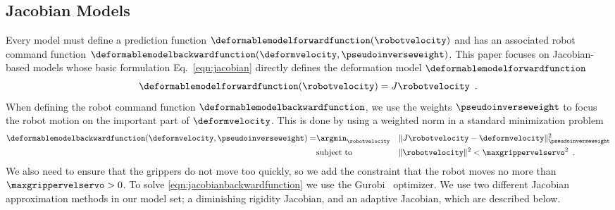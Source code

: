 \subsection{Jacobian Models}
\label{sec:jacobian_models}

Every model must define a prediction function $\deformablemodelforwardfunction(\robotvelocity)$ and has an associated robot command function $\deformablemodelbackwardfunction(\deformvelocity, \pseudoinverseweight)$. This paper focuses on Jacobian-based models whose basic formulation Eq.~\eqref{eqn:jacobian} directly defines the deformation model $\deformablemodelforwardfunction$
\begin{equation}
    \deformablemodelforwardfunction(\robotvelocity) = J \robotvelocity \enspace.
    \label{eqn:jacobianforwardfunction}
\end{equation}
When defining the robot command function $\deformablemodelbackwardfunction$, we use the weights $\pseudoinverseweight$ to focus the robot motion on the important part of $\deformvelocity$. This is done by using a weighted norm in a standard minimization problem
\begin{equation}
    \begin{aligned}
        \deformablemodelbackwardfunction(\deformvelocity, \pseudoinverseweight) =
                    & \argmin_{\robotvelocity } 
                    & & \| J \robotvelocity - \deformvelocity \|^2_{\pseudoinverseweight} \\
                    &\text{subject to}           
                    & & \| \robotvelocity \|^2 < \maxgrippervelservo^2 \enspace.
        \label{eqn:jacobianbackwardfunction}
    \end{aligned}
\end{equation}
We also need to ensure that the grippers do not move too quickly, so we add the constraint that the robot moves no more than $\maxgrippervelservo > 0$. To solve \eqref{eqn:jacobianbackwardfunction} we use the Gurobi~\cite{Gurobi2016} optimizer. We use two different Jacobian approximation methods in our model set; a diminishing rigidity Jacobian, and an adaptive Jacobian, which are described below.


